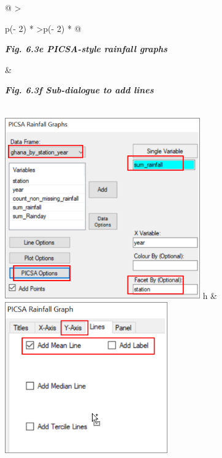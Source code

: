 \documentclass[
  letterpaper,
  DIV=11,
  numbers=noendperiod]{scrreprt}
\begin{document}
\begin{longtable}[]{@{}
  >{\raggedright\arraybackslash}p{(\columnwidth - 2\tabcolsep) * }
  >{\raggedleft\arraybackslash}p{(\columnwidth - 2\tabcolsep) * }@{}}
\toprule\noalign{}
\begin{minipage}[b]{\linewidth}\raggedright
\textbf{\emph{Fig. 6.3e PICSA-style rainfall graphs}}
\end{minipage} & \begin{minipage}[b]{\linewidth}\raggedleft
\textbf{\emph{Fig. 6.3f Sub-dialogue to add lines}}
\end{minipage} \\
\midrule\noalign{}
\endhead
\bottomrule\noalign{}
\endlastfoot
\includegraphics[width=3.31225in,height=3.08749in]{figures/Fig6.3e.png}
h &
\includegraphics[width=2.75709in,height=\textheight]{figures/Fig6.3f.png} \\
\end{longtable}
\end{document}
